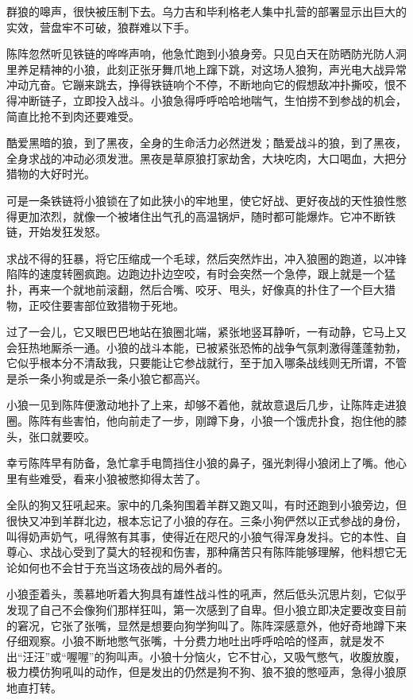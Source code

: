 \par 群狼的嗥声，很快被压制下去。乌力吉和毕利格老人集中扎营的部署显示出巨大的实效，营盘牢不可破，狼群难以下手。
\par 陈阵忽然听见铁链的哗哗声响，他急忙跑到小狼身旁。只见白天在防晒防光防人洞里养足精神的小狼，此刻正张牙舞爪地上蹿下跳，对这场人狼狗，声光电大战异常冲动亢奋。它蹦来跳去，挣得铁链响个不停，不断地向它的假想敌冲扑撕咬，恨不得冲断链子，立即投入战斗。小狼急得呼呼哈哈地喘气，生怕捞不到参战的机会，简直比抢不到肉还要难受。
\par 酷爱黑暗的狼，到了黑夜，全身的生命活力必然迸发；酷爱战斗的狼，到了黑夜，全身求战的冲动必须发泄。黑夜是草原狼打家劫舍，大块吃肉，大口喝血，大把分猎物的大好时光。
\par 可是一条铁链将小狼锁在了如此狭小的牢地里，使它好战、更好夜战的天性狼性憋得更加浓烈，就像一个被堵住出气孔的高温锅炉，随时都可能爆炸。它冲不断铁链，开始发狂发怒。
\par 求战不得的狂暴，将它压缩成一个毛球，然后突然炸出，冲入狼圈的跑道，以冲锋陷阵的速度转圈疯跑。边跑边扑边空咬，有时会突然一个急停，跟上就是一个猛扑，再来一个就地前滚翻，然后合嘴、咬牙、甩头，好像真的扑住了一个巨大猎物，正咬住要害部位致猎物于死地。
\par 过了一会儿，它又眼巴巴地站在狼圈北端，紧张地竖耳静听，一有动静，它马上又会狂热地厮杀一通。小狼的战斗本能，已被紧张恐怖的战争气氛刺激得蓬蓬勃勃，它似乎根本分不清敌我，只要能让它参战就行，至于加入哪条战线则无所谓，不管是杀一条小狗或是杀一条小狼它都高兴。
\par 小狼一见到陈阵便激动地扑了上来，却够不着他，就故意退后几步，让陈阵走进狼圈。陈阵有些害怕，他向前走了一步，刚蹲下身，小狼一个饿虎扑食，抱住他的膝头，张口就要咬。
\par 幸亏陈阵早有防备，急忙拿手电筒挡住小狼的鼻子，强光刺得小狼闭上了嘴。他心里有些难受，看来小狼被憋抑得太苦了。
\par 全队的狗又狂吼起来。家中的几条狗围着羊群又跑又叫，有时还跑到小狼旁边，但很快又冲到羊群北边，根本忘记了小狼的存在。三条小狗俨然以正式参战的身份，叫得奶声奶气，吼得煞有其事，使得近在咫尺的小狼气得浑身发抖。它的本性、自尊心、求战心受到了莫大的轻视和伤害，那种痛苦只有陈阵能够理解，他料想它无论如何也不会甘于充当这场夜战的局外者的。
\par 小狼歪着头，羡慕地听着大狗具有雄性战斗性的吼声，然后低头沉思片刻，它似乎发现了自己不会像狗们那样狂叫，第一次感到了自卑。但小狼立即决定要改变目前的窘况，它张了张嘴，显然是想要向狗学狗叫了。陈阵深感意外，他好奇地蹲下来仔细观察。小狼不断地憋气张嘴，十分费力地吐出呼呼哈哈的怪声，就是发不出“汪汪”或“喔喔”的狗叫声。小狼十分恼火，它不甘心，又吸气憋气，收腹放腹，极力模仿狗吼叫的动作，但是发出的仍然是狗不狗、狼不狼的憋哑声，急得小狼原地直打转。
